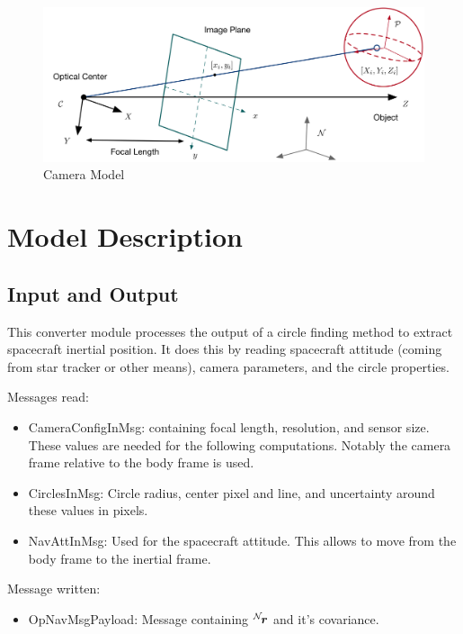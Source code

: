 

\begin{figure}[H]
	\centerline{
		\includegraphics{Figures/CameraGeometry}
	}
	\caption{Camera Model}
	\label{fig:camera}
\end{figure}

\section{Model Description}

\subsection{Input and Output}

This converter module processes the output of a circle finding method to extract spacecraft inertial position. It does this by reading spacecraft attitude (coming from star tracker or other means), camera parameters, and the circle properties. 

Messages read:

\begin{itemize}
\item CameraConfigInMsg: containing focal length, resolution, and sensor size. These values are needed for the following computations. Notably the camera frame relative to the body frame is used.
\item CirclesInMsg: Circle radius, center pixel and line, and uncertainty around these values in pixels. 
\item NavAttInMsg: Used for the spacecraft attitude. This allows to move from the body frame to the inertial frame.
\end{itemize}

Message written:
\begin{itemize}
\item OpNavMsgPayload: Message containing $\leftexp{N}{\bm r}$ and it's covariance.
\end{itemize}

